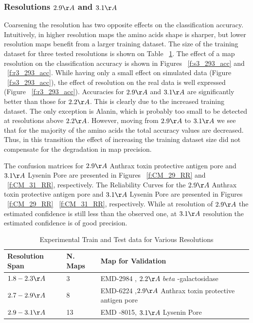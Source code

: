 \subsubsection{Resolutions $2.9 \AA$ and   $3.1 \AA$ }
Coarsening the resolution has two opposite effects on the classification accuracy.
Intuitively, in higher resolution maps the amino acids shape is sharper, but lower resolution maps benefit from a larger training dataset.
The size of the training dataset for three tested resolutions is shown on Table ~\ref{t0}.
The effect of a map resolution on the classification accuracy is shown in Figures ~\ref{f:s3_293_acc} and ~\ref{f:r3_293_acc}.
While having only a small effect on simulated data (Figure ~\ref{f:s3_293_acc}), the effect of resolution on the real data is well expressed (Figure ~\ref{f:r3_293_acc}).
 Accuracies for $2.9 \AA$ and $3.1 \AA$ are significantly better than those for $2.2 \AA$. This is clearly due to the increased training dataset. 
 The only exception is Alanin, which is probably too small to be detected at resolutions above $2.2 \AA$.
However, moving from $2.9 \AA$ to $3.1 \AA$ we see that for the majority of the amino acids the total accuracy values are decreased.  Thus, in this transition the effect of increasing the training dataset size did not compensate for the degradation in map precision.
 
The confusion matrices for $2.9 \AA$ Anthrax toxin protective antigen pore and $3.1 \AA $ Lysenin Pore are presented in Figures ~\ref{f:CM_29_RR} and ~\ref{f:CM_31_RR}, respectively. The Reliability Curves for the $2.9 \AA$ Anthrax toxin protective antigen pore and $3.1 \AA $ Lysenin Pore are presented in Figures ~\ref{f:CM_29_RR} ~\ref{f:CM_31_RR}, respectively.
 While at resolution of $2.9 \AA$ the estimated confidence is still less than the observed one, at $3.1 \AA$ resolution the estimated confidence is of good precision.
 
\begin{table}
\small
\begin{tabular}{ | m{5em} | m{1cm} | m{3cm}| }
\hline
 Resolution Span & N. Maps  & Map for Validation \\
\hline
 $1.8-2.3 \AA$  & 3  & EMD-2984 , $2.2 \AA$ $beta$ -galactosidase \cite[]{Banerjee2016} \\
\hline
 $2.7-2.9 \AA$  & 8  & EMD-6224 ,$2.9 \AA$  Anthrax toxin protective antigen pore \cite[]{Jiang2015} \\
\hline
 $2.9-3.1 \AA$  & 13  & EMD -8015, $3.1 \AA$ Lysenin Pore \cite[]{Bokori-Brown2016} \\
\hline
 \end{tabular}
\caption{Experimental Train and Test data for Various Resolutions}\label{t0}
\end{table}

